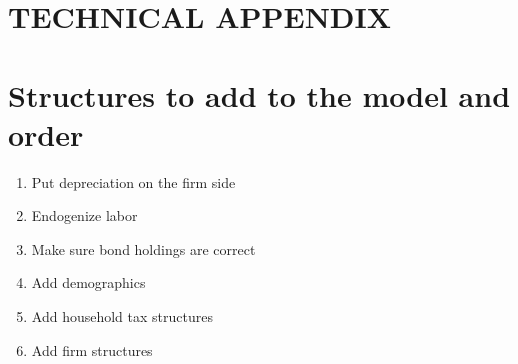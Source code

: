 \documentclass[letterpaper,12pt]{article}
\theoremstyle{definition}
\begin{document}


\newpage



\newpage
\renewcommand{\theequation}{T.\arabic{section}.\arabic{equation}}
\renewcommand{\thesection}{T-\arabic{section}}   %
\setcounter{equation}{0}                         %
\setcounter{section}{0}                          %
\section*{TECHNICAL APPENDIX}


\section{Structures to add to the model and order}\label{TAppSteps}

  \begin{enumerate}
    \item Put depreciation on the firm side
    \item Endogenize labor
    \item Make sure bond holdings are correct
    \item Add demographics
    \item Add household tax structures
    \item Add firm structures
  \end{enumerate}
\end{document}
